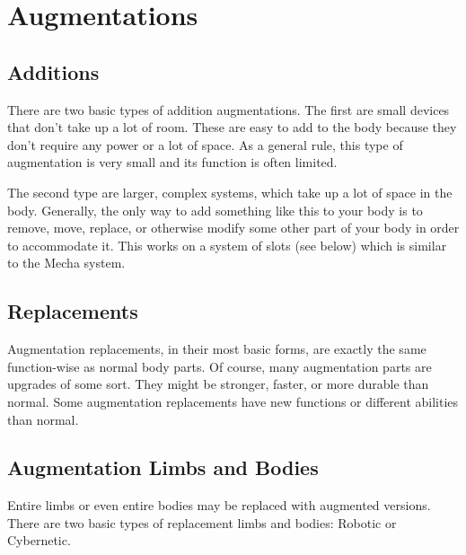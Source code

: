 \documentclass[twoside]{book}
\begin{document}
    

\chapter{Augmentations}
    
    

\section{Additions}
    
    {  
    There are two basic types of addition augmentations.
             The first are small devices that don't take up a lot
             of room. These are easy to add to the body because they
             don't require any power or a lot of space. As a
             general rule, this type of augmentation is very small and
             its function is often limited. 
    }
  
    {  
    The second type are larger, complex systems, which
             take up a lot of space in the body. Generally, the only way
             to add something like this to your body is to remove, move,
             replace, or otherwise modify some other part of your body in
             order to accommodate it. This works on a system of slots
             (see below) which is similar to the Mecha system. 
    }
  
    

\section{Replacements}
    
    {  
    Augmentation replacements, in their most basic forms,
             are exactly the same function-wise as normal body parts. Of
             course, many augmentation parts are upgrades of some sort.
             They might be stronger, faster, or more durable than normal.
             Some augmentation replacements have new functions or
             different abilities than normal. 
    }
  
    

\section{Augmentation Limbs and Bodies}
    
    {  
    Entire limbs or even entire bodies may be replaced
             with augmented versions. There are two basic types of
             replacement limbs and bodies: Robotic or Cybernetic. 
    }
  
\end{document}
